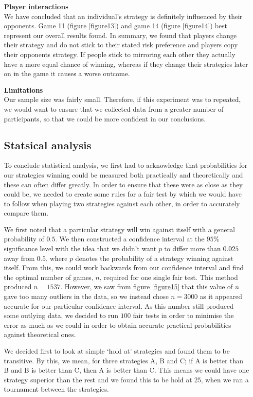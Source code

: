 \documentclass[a4paper,titlepage]{article}
\begin{document}
 \textbf{Player interactions}\\We have concluded that an individual’s strategy is definitely influenced by their opponents. Game 11 (figure \ref{figure13}) and game 14 (figure \ref{figure14}) best represent our overall results found. In summary, we found that players change their strategy and do not stick to their stated risk preference and players copy their opponents strategy. If people stick to mirroring each other they actually have a more equal chance of winning, whereas if they change their strategies later on in the game it causes a worse outcome.

 \textbf{Limitations}\\ Our sample size was fairly small. Therefore, if this experiment was to repeated, we would want to ensure that we collected data from a greater number of participants, so that we could be more confident in our conclusions.

\subsection{Statsical analysis}
To conclude statistical analysis, we first had to acknowledge that probabilities for our strategies winning could be measured both practically and theoretically and these can often differ greatly. In order to ensure that these were as close as they could be, we needed to create some rules for a fair test by which we would have to follow when playing two strategies against each other, in order to accurately compare them.

We first noted that a particular strategy will win against itself with a general probability of $0.5$. We then constructed a confidence interval at the $95\%$ significance level with the idea that we didn’t want $p$ to differ more than $0.025$ away from $0.5$, where $p$ denotes the probability of a strategy winning against itself. From this, we could work backwards from our confidence interval and find the optimal number of games, $n$, required for one single fair test. This method produced $n=1537$. However, we saw from figure \ref{figure15} that this value of $n$ gave too many outliers in the data, so we instead chose $n=3000$ as it appeared accurate for our particular confidence interval. As this number still produced some outlying data, we decided to run $100$ fair tests in order to minimise the error as much as we could in order to obtain accurate practical probabilities against theoretical ones.

We decided first to look at simple ‘hold at’ strategies and found them to be transitive. By this, we mean, for three strategies A, B and C; if A is better than B and B is better than C, then A is better than C. This means we could have one strategy superior than the rest and we found this to be hold at 25, when we ran a tournament between the strategies.
\end{document}
